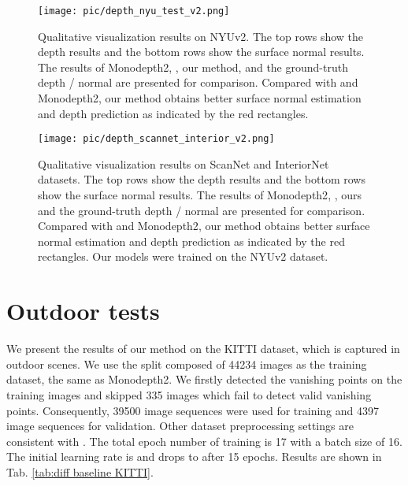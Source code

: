 \documentclass[10pt,twocolumn,letterpaper]{article}
\begin{document}
\begin{figure*}[t!]
	\texttt{[image: pic/depth\_nyu\_test\_v2.png]}
	\caption{Qualitative visualization results on NYUv2.
 The top rows show the depth results and the bottom rows show the surface normal results.
		The results of Monodepth2\cite{godard2019digging}, \cite{yu2020p}, our method, and the ground-truth depth / normal are presented for comparison.
		Compared with  \cite{yu2020p} and Monodepth2\cite{godard2019digging}, our method obtains better surface normal estimation and depth prediction as indicated by the red rectangles.
} 
	\label{Fig:depth results visualization nyu}
\end{figure*}

\begin{figure*}[t!]
	\texttt{[image: pic/depth\_scannet\_interior\_v2.png]}
	\caption{Qualitative visualization results on ScanNet and InteriorNet datasets.
 The top rows show the depth results and the bottom rows show the surface normal results.
		The results of Monodepth2\cite{godard2019digging}, \cite{yu2020p}, ours and the ground-truth depth / normal are presented for comparison.
		Compared with  \cite{yu2020p} and Monodepth2\cite{godard2019digging}, our method obtains better surface normal estimation and depth prediction as indicated by the red rectangles. Our models were trained on the NYUv2 dataset.
	} 
	\label{Fig:depth results visualization ScanInter}
\end{figure*}


\section{Outdoor tests}

We present the results of our method on the KITTI dataset, which is captured in outdoor scenes.
We use the split composed of 44234 images as the training dataset, the same as Monodepth2\cite{godard2019digging}.
We firstly detected the vanishing points on the training images and skipped 335 images which fail to detect valid vanishing points.
Consequently, 39500 image sequences were used for training and 4397 image sequences for validation.
Other dataset preprocessing settings are consistent with \cite{godard2019digging}. 
The total epoch number of training is 17 with a batch size of 16. The initial learning rate is  and drops to  after 15 epochs. 
Results are shown in Tab. \ref{tab:diff baseline KITTI}. 
\end{document}
